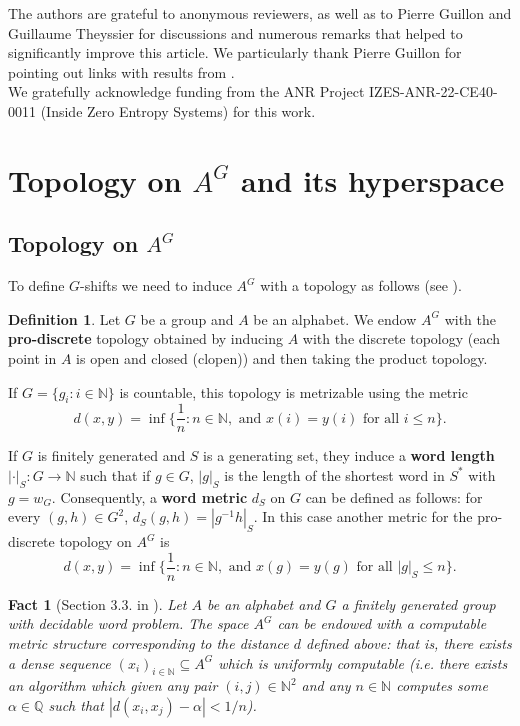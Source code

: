 \documentclass[french,american]{article}
\theoremstyle{plain}
\theoremstyle{definition}
\newtheorem{definition}[theorem]{Definition}
\theoremstyle{remark}
\theoremstyle{plain}
\newtheorem{fact}[theorem]{Fact}
\begin{document}
	The authors are grateful to anonymous reviewers, as well as to Pierre Guillon and Guillaume Theyssier for discussions and numerous remarks that helped to significantly improve this article. We particularly thank Pierre Guillon for pointing out links with results from \cite{jeandel2017enumeration}. \\
	We gratefully acknowledge funding from the ANR Project IZES-ANR-22-CE40-0011 (Inside Zero Entropy Systems) for this work.




\appendix

\section[Topology on A\^{}G and its hyperspace]{Topology on $A^{G}$ and its hyperspace}\label{Appendix:Topology-on}

\subsection{Topology on $A^{G}$}\label{subsec:Topology-on-1}

To define $G$-shifts we need to induce $A^{G}$ with a topology as
follows (see \cite{ceccherini2010cellular}).
\begin{definition}
Let $G$ be a group and $A$ be an alphabet. We endow $A^{G}$ with
the \textbf{pro-discrete} topology obtained by inducing $A$ with
the discrete topology (each point in $A$ is open and closed (clopen))
and then taking the product topology. 

If $G=\{g_{i}:i\in\mathbb{N}\}$ is countable, this topology is metrizable
using the metric 
\[
d(x,y)=\inf\{\frac{1}{n}:n\in\mathbb{N},\text{ and }x(i)=y(i)\text{ for all }i\leq n\}.
\]

If $G$ is finitely generated and $S$ is a generating set, they induce
a \textbf{word length} $|\cdot|_{S}:G\rightarrow\mathbb{N}$ such
that if $g\in G$, $|g|_{S}$ is the length of the shortest word in
$S^{*}$ with $g=w_{G}$. Consequently, a \textbf{word metric} $d_{S}$
on $G$ can be defined as follows: for every $(g,h)\in G^{2}$, $d_{S}(g,h)=|g^{-1}h|_{S}$.
In this case another metric for the pro-discrete topology on $A^{G}$
is 
\[
d(x,y)=\inf\{\frac{1}{n}:n\in\mathbb{N},\text{ and }x(g)=y(g)\text{ for all }|g|_S\leq n\}.
\]
\end{definition}

\begin{fact}[Section 3.3. in \cite{barbieri2024effective}]
\label{fact:AGcomputablemetric}
Let $A$ be an alphabet and $G$ a finitely generated group with decidable word problem. The space $A^{G}$ can be endowed with a computable
metric structure corresponding to the distance $d$ defined above: that is, there exists a dense
sequence $(x_{i})_{i\in\mathbb{N}}\subseteq A^{G}$ which is uniformly
computable (i.e. there exists an algorithm which given any pair $(i,j)\in\mathbb{N}^{2}$
and any $n\in\mathbb{N}$ computes some $\alpha\in\mathbb{Q}$ such
that $|d(x_{i},x_{j})-\alpha|<1/n$).

\end{fact}
\end{document}
